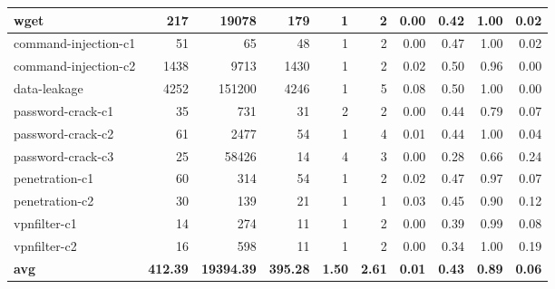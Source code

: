 \begin{table*}[!t]
{\begin{tabular}{|l|r|r|r|r|r|r|r|r|r|}
wget                    & 217                  & 19078             & 179         & 1                & 2       & 0.00                      & 0.42           & 1.00                         & 0.02                 \\ \hline
command-injection-c1      & 51                   & 65                & 48          & 1                & 2       & 0.00                      & 0.47           & 1.00                         & 0.02                 \\ \hline
command-injection-c2      & 1438                 & 9713              & 1430        & 1                & 2       & 0.02                      & 0.50           & 0.96                         & 0.00                    \\ \hline
data-leakage        & 4252                 & 151200            & 4246        & 1                & 5       & 0.08                      & 0.50           & 1.00                         & 0.00                    \\ \hline
password-crack-c1 & 35                   & 731               & 31          & 2                & 2       & 0.00                      & 0.44           & 0.79                         & 0.07                 \\ \hline
password-crack-c2 & 61                   & 2477              & 54          & 1                & 4       & 0.01                      & 0.44           & 1.00                         & 0.04                 \\ \hline
password-crack-c3 & 25                   & 58426             & 14          & 4                & 3       & 0.00                      & 0.28           & 0.66                         & 0.24                 \\ \hline
penetration-c1 & 60                   & 314               & 54          & 1                & 2       & 0.02                      & 0.47           & 0.97                         & 0.07                 \\ \hline
penetration-c2 & 30                   & 139               & 21          & 1                & 1       & 0.03                      & 0.45           & 0.90                         & 0.12                 \\ \hline
vpnfilter-c1      & 14                   & 274               & 11          & 1                & 2       & 0.00                      & 0.39           & 0.99                         & 0.08                 \\ \hline
vpnfilter-c2      & 16                   & 598               & 11          & 1                & 2       & 0.00                      & 0.34           & 1.00                         & 0.19                 \\ \hline
\textbf{avg} &\textbf{412.39} &\textbf{19394.39} &\textbf{395.28} &\textbf{1.50} &\textbf{2.61} &\textbf{0.01} &\textbf{0.43} &\textbf{0.89} &\textbf{0.06}\\ \hline
\end{tabular}
}
\label{tab:summary}
\end{table*}    

